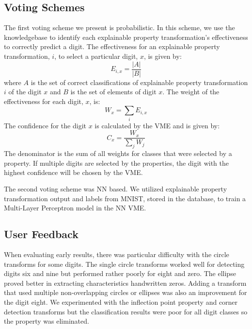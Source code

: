 \documentclass[conference]{IEEEtran}
\begin{document}
\subsection{Voting Schemes}
\label{subsection:Voting}

The first voting scheme we present is probabilistic.  In this scheme, we use the knowledgebase to identify each explainable property transformation's effectiveness to correctly predict a digit.   The effectiveness for an explainable property transformation, $i$, to select a particular digit, $x$,  is given by:
\begin{equation}\label{effectiveness}
E_{i,x}  = \frac{|A|}{|B|}
\end{equation}
where $A$ is the set of correct classifications of explainable property transformation $i$ of the digit $x$ and $B$ is the set of elements of digit $x$.  The weight of the effectiveness for each digit, $x$, is:
\begin{equation}\label{weight}
W_x=\sum_i E_{i, x}
\end{equation}
The confidence for the digit $x$ is calculated by the VME and is given by:
\begin{equation}\label{conf}
C_x=\frac{W_x}{\sum\limits_jW_j}
\end{equation}
The denominator is the sum of all weights for classes that were selected by a property.  If multiple digits are selected by the properties, the digit with the highest confidence will be chosen by the VME.

The second voting scheme was NN based.  We utilized explainable property transformation output and labels from MNIST, stored in the database, to train a Multi-Layer Perceptron model in the NN VME.

\subsection{ User Feedback}

When evaluating early results, there was particular difficulty with the circle transforms for some digits.   The single circle transforms worked well for detecting digits six and nine but performed rather poorly for eight and zero.  The ellipse proved better in extracting characteristics handwritten zeros.   Adding a transform that used multiple non-overlapping circles or ellipses was also an improvement for the digit eight.  We experimented with the inflection point property and corner detection transforms but the classification results were poor for all digit classes so the property was eliminated.
\end{document}
